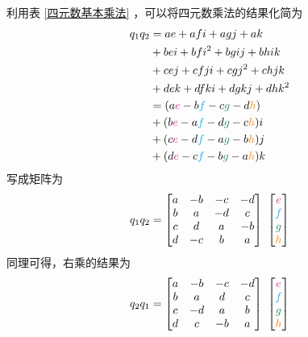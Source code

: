 \summarize[
\hspace{1em} 记忆方法：类似于向量的叉乘，将$i,j,k$理解为三维右手坐标系，则$i \times j =k , j \times i = -k$，其余类似。
]

利用表 \ref{四元数基本乘法} ，可以将四元数乘法的结果化简为
\begin{align}
	q_1 q_2 & = ae + afi + agj + ak \notag \\
& + bei + bfi^2 + bgij + bhik \notag \\
& + cej + cfji + cgj^2 + chjk \notag \\
& + dek + dfki + dgkj + dhk^2 \notag \\
& = (a {\color{VioletRed} e} - b {\color{cyan} f} - c{\color{SeaGreen} g} - d{\color{orange} h}) \notag \\
& + (b {\color{VioletRed} e} - a {\color{cyan} f} - d{\color{SeaGreen} g} - c{\color{orange} h}) i \notag \\
& + (c {\color{VioletRed} e} - d {\color{cyan} f} - a{\color{SeaGreen} g} - b{\color{orange} h}) j \notag \\
& + (d {\color{VioletRed} e} - c {\color{cyan} f} - b{\color{SeaGreen} g} - a{\color{orange} h}) k
\end{align}
写成矩阵为
\begin{equation}
		q_1 q_2 = 
		\begin{bmatrix}
			a & -b & -c & -d \\
			b & a & -d & c \\
			c & d & a & -b \\
			d & -c & b & a
		\end{bmatrix}
		\,\, 
		\begin{bmatrix}
		 {\color{VioletRed} e} \\
		 {\color{cyan} f} \\
		 {\color{SeaGreen} g} \\
		 {\color{orange} h} 
		\end{bmatrix}
\end{equation}
同理可得，右乘的结果为
\begin{equation}
	q_2 q_1 = 
	\begin{bmatrix}
		a & -b & -c & -d \\
		b & a & d & c \\
		c & -d & a & b \\
		d & c & -b & a
	\end{bmatrix}
	\,\, 
	\begin{bmatrix}
		{\color{VioletRed} e} \\
		{\color{cyan} f} \\
		{\color{SeaGreen} g} \\
		{\color{orange} h} 
	\end{bmatrix}
\end{equation}
\vspace*{0.5em}


